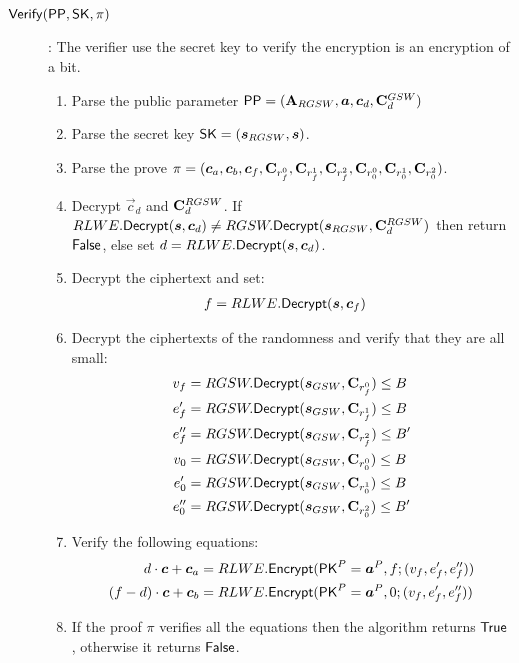 \begin{description}
\item[${\mathsf{Verify}}({\mathsf{PP}}, \mathsf{SK}, \pi)$]: The verifier use the secret key to verify the encryption is an encryption of a bit.
  \begin{enumerate}
  \item Parse the public parameter $\PPP = (\mat{A}_{RGSW}, \vec{a}, \vec{c}_d, \mat{C}_d^{GSW})$
  \item Parse the secret key $\SK = (\vec{s}_{RGSW}, \vec{s})$.
  \item Parse the prove $\pi = (\vec{c}_a, \vec{c}_b, \vec{c}_f, \mat{C}_{r_f^0}, \mat{C}_{r_f^1}, \mat{C}_{r_f^2}, \mat{C}_{r_0^0}, \mat{C}_{r_0^1}, \mat{C}_{r_0^2})$.
  \item Decrypt $\vec{c}_d$ and $\mathbf{C}_d^{RGSW}$.
    If $RLWE.\Dec(\vec{s}, \vec{c}_d) \neq RGSW.\Dec(\vec{s}_{RGSW}, \mat{C}_d^{RGSW})$ then return $\mathsf{False}$, else set $d = RLWE.\Dec(\vec{s}, \vec{c}_d)$.
  \item Decrypt the ciphertext and set:
    \begin{align*}
      f &= RLWE.\Dec(\vec{s}, \vec{c}_f)
    \end{align*}
  \item Decrypt the ciphertexts of the randomness and verify that they are all small:
    \begin{align*}
      v_f & = RGSW.\Dec(\vec{s}_{GSW}, \mat{C}_{r_f^0}) \leq B \\
      e_f' & = RGSW.\Dec(\vec{s}_{GSW}, \mat{C}_{r_f^1}) \leq B \\
      e_f'' & = RGSW.\Dec(\vec{s}_{GSW}, \mat{C}_{r_f^2}) \leq B' \\
      v_0 & = RGSW.\Dec(\vec{s}_{GSW}, \mat{C}_{r_0^0}) \leq B \\
      e_0' & = RGSW.\Dec(\vec{s}_{GSW}, \mat{C}_{r_0^1}) \leq B \\
      e_0'' & = RGSW.\Dec(\vec{s}_{GSW}, \mat{C}_{r_0^2}) \leq B' \\
    \end{align*}
  \item Verify the following equations:
    \begin{align*}
      d \cdot \vec{c} + \vec{c}_a &= RLWE.\Enc(\PK^P = \vec{a}^P, f; (v_f, e_f', e_f''))\\
      (f-d) \cdot \vec{c} + \vec{c}_b &= RLWE.\Enc(\PK^P= \vec{a}^P, 0; (v_f, e_f', e_f''))
    \end{align*}
  \item If the proof $\pi$ verifies all the equations then the algorithm returns $\mathsf{True}$, otherwise it returns $\mathsf{False}$.
  \end{enumerate}
  
  
  
\end{description}
